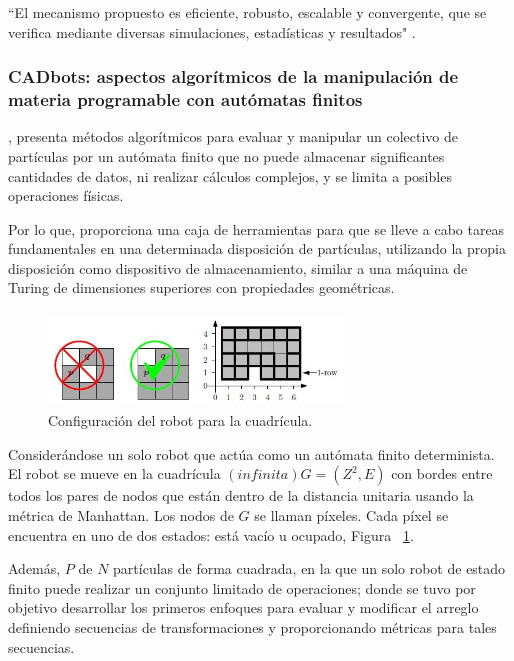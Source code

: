 \documentclass[10pt,conference]{IEEEtran}
\begin{document}
   “El mecanismo propuesto es eficiente, robusto, escalable y convergente, que se verifica mediante diversas simulaciones, estadísticas y resultados" \cite[p.~29]{zhu2017distributed}.

\vspace{2.5mm}  
\subsubsection{\textbf{CADbots: aspectos algorítmicos de la manipulación de materia programable con autómatas finitos}}
    , presenta métodos algorítmicos para evaluar y manipular un colectivo de partículas por un autómata finito que no puede almacenar significantes cantidades de datos, ni realizar cálculos complejos, y se limita a posibles operaciones físicas.
    
    Por lo que, proporciona una caja de herramientas para que se lleve a cabo tareas fundamentales 
    en una determinada disposición de partículas, utilizando la propia disposición como dispositivo de almacenamiento, similar a una máquina de Turing de dimensiones superiores con propiedades geométricas.
    
    \begin{figure}[H]
    \begin{center}
    \includegraphics[width=7.8cm, height=2.5cm]{Ind.Tecnolo/cad.JPG}
    \caption{Configuración del robot para la cuadrícula.}
    \label{Tec.4} 
    \end{center}
    \end{figure}
    
    Considerándose un solo robot que actúa como un autómata finito determinista. El robot se mueve en la cuadrícula $(infinita) G = ({Z}^2 , E)$ con bordes entre todos los pares de nodos que están dentro de la distancia unitaria usando la métrica de Manhattan. Los nodos de $G$ se llaman píxeles. Cada píxel se encuentra en uno de dos estados: está vacío u ocupado, Figura ~\ref{Tec.4}.
    
    Además, $P$ de $N$ partículas de forma cuadrada, en la que un solo robot de estado finito puede realizar un conjunto limitado de operaciones; donde se tuvo por objetivo desarrollar los primeros enfoques para evaluar y modificar el arreglo definiendo secuencias de transformaciones y proporcionando métricas para tales secuencias. 
\vspace{2.5mm}
\end{document}
